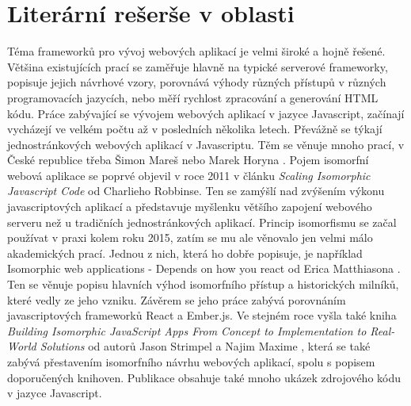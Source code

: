 \section{Literární rešerše v oblasti}
Téma frameworků pro vývoj webových aplikací je velmi široké a hojně řešené. Většina existujících prací se zaměřuje hlavně na typické serverové frameworky, popisuje jejich návrhové vzory, porovnává výhody různých přístupů v různých programovacích jazycích, nebo měří rychlost zpracování a generování HTML kódu. Práce zabývající se vývojem webových aplikací v jazyce Javascript, začínají vycházejí ve velkém počtu až v posledních několika letech. Převážně se týkají jednostránkových webových aplikací v Javascriptu. Těm se věnuje mnoho prací, v České republice třeba Šimon Mareš \cite{simon_spa} nebo Marek Horyna \cite{spa_horyna}. Pojem isomorfní webová aplikace se poprvé objevil v roce 2011 v článku \textit{Scaling Isomorphic Javascript Code} \cite{isomorphic_founder} od Charlieho Robbinse. Ten se zamýšlí nad zvýšením výkonu javascriptových aplikací a představuje myšlenku většího zapojení webového serveru než u tradičních jednostránkových aplikací. Princip isomorfismu se začal používat v praxi kolem roku 2015, zatím se mu ale věnovalo jen velmi málo akademických prací. Jednou z nich, která ho dobře popisuje, je například Isomorphic web applications - Depends on how you react od Erica Matthiasona \cite{mathiasson-isomorphic}. Ten se věnuje popisu hlavních výhod isomorfního přístup a historických milníků, které vedly ze jeho vzniku. Závěrem se jeho práce zabývá porovnáním javascriptových frameworků React a Ember.js. Ve stejném roce vyšla také kniha \textit{Building Isomorphic JavaScript Apps From Concept to Implementation to Real-World Solutions} od autorů Jason Strimpel a Najim Maxime \cite{isomorhic_book}, která se také zabývá přestavením isomorfního návrhu webových aplikací, spolu s popisem doporučených knihoven. Publikace obsahuje také mnoho ukázek zdrojového kódu v jazyce Javascript.


